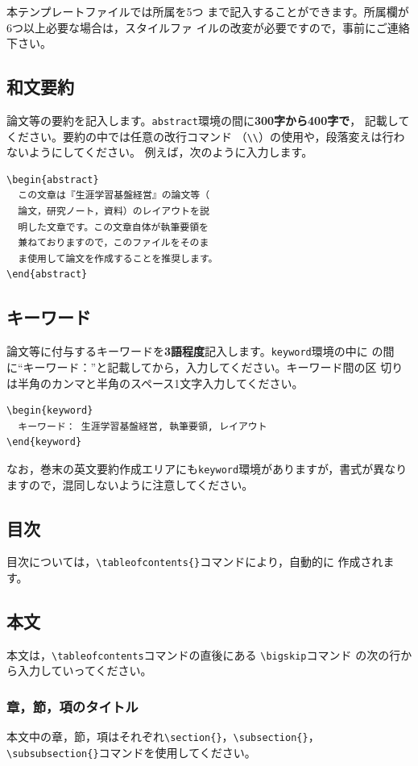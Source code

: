 \documentclass[b5paper,10pt,twocolumn,tombow]{jarticle}
\begin{document}
本テンプレートファイルでは所属を5つ
まで記入することができます。所属欄が6つ以上必要な場合は，スタイルファ
イルの改変が必要ですので，事前にご連絡下さい。


\subsection{和文要約}
論文等の要約を記入します。\texttt{abstract}環境の間に\textbf{300字から400字で}，
記載してください。要約の中では任意の改行コマンド
（\verb|\\|）の使用や，段落変えは行わないようにしてください。
例えば，次のように入力します。
\begin{verbatim}
\begin{abstract}
  この文章は『生涯学習基盤経営』の論文等（
  論文，研究ノート，資料）のレイアウトを説
  明した文章です。この文章自体が執筆要領を
  兼ねておりますので，このファイルをそのま
  ま使用して論文を作成することを推奨します。
\end{abstract}
\end{verbatim}


\subsection{キーワード}
論文等に付与するキーワードを\textbf{3語程度}記入します。\texttt{keyword}環境の中に
の間に``キーワード：''と記載してから，入力してください。キーワード間の区
切りは半角のカンマと半角のスペース1文字入力してください。
\begin{verbatim}
\begin{keyword}
  キーワード： 生涯学習基盤経営, 執筆要領, レイアウト
\end{keyword}
\end{verbatim}
なお，巻末の英文要約作成エリアにも\texttt{keyword}環境がありますが，書式が異なり
ますので，混同しないように注意してください。
\subsection{目次}
目次については，\verb|\tableofcontents{}|コマンドにより，自動的に
作成されます。
\subsection{本文}
本文は，\verb|\tableofcontents|コマンドの直後にある
\verb|\bigskip|コマンド
の次の行から入力していってください。
\subsubsection{章，節，項のタイトル}
本文中の章，節，項はそれぞれ\verb|\section{}|，\verb|\subsection{}|，
\verb|\subsubsection{}|コマンドを使用してください。
\end{document}
